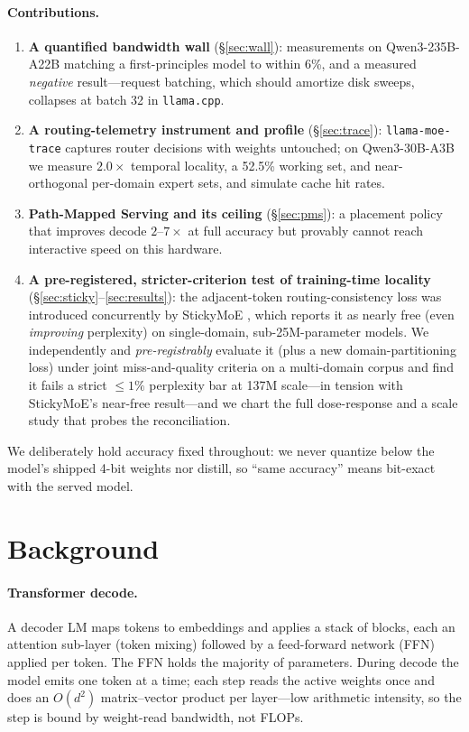 \documentclass[11pt]{article}
\begin{document}
\paragraph{Contributions.}
\begin{enumerate}\itemsep2pt
\item \textbf{A quantified bandwidth wall} (\S\ref{sec:wall}): measurements on
Qwen3-235B-A22B matching a first-principles model to within 6\%, and a measured
\emph{negative} result---request batching, which should amortize disk sweeps,
collapses at batch 32 in \texttt{llama.cpp}.
\item \textbf{A routing-telemetry instrument and profile} (\S\ref{sec:trace}):
\texttt{llama-moe-trace} captures router decisions with weights untouched; on
Qwen3-30B-A3B we measure $2.0\times$ temporal locality, a 52.5\% working set,
and near-orthogonal per-domain expert sets, and simulate cache hit rates.
\item \textbf{Path-Mapped Serving and its ceiling} (\S\ref{sec:pms}): a placement
policy that improves decode $2$--$7\times$ at full accuracy but provably cannot
reach interactive speed on this hardware.
\item \textbf{A pre-registered, stricter-criterion test of training-time locality}
(\S\ref{sec:sticky}--\ref{sec:results}): the adjacent-token routing-consistency loss
was introduced concurrently by StickyMoE \citep{kayyam2026sticky}, which reports it
as nearly free (even \emph{improving} perplexity) on single-domain, sub-25M-parameter
models. We independently and \emph{pre-registrably} evaluate it (plus a new
domain-partitioning loss) under joint miss-and-quality criteria on a multi-domain
corpus and find it fails a strict $\le\!1\%$ perplexity bar at 137M scale---in tension
with StickyMoE's near-free result---and we chart the full dose-response and a scale
study that probes the reconciliation.
\end{enumerate}
We deliberately hold accuracy fixed throughout: we never quantize below the
model's shipped 4-bit weights nor distill, so ``same accuracy'' means bit-exact
with the served model.

\section{Background}
\paragraph{Transformer decode.}
A decoder LM maps tokens to embeddings and applies a stack of blocks, each an
attention sub-layer (token mixing) followed by a feed-forward network (FFN)
applied per token. The FFN holds the majority of parameters. During decode the
model emits one token at a time; each step reads the active weights once and
does an $O(d^2)$ matrix--vector product per layer---low arithmetic intensity, so
the step is bound by weight-read bandwidth, not FLOPs.
\end{document}
